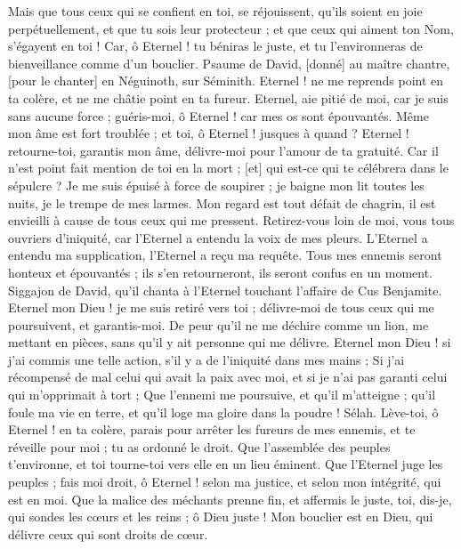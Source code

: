 \begin{multicols}{2}
Mais que tous ceux qui se confient en toi, se réjouissent, qu'ils soient en joie perpétuellement, et que tu sois leur protecteur ; et que ceux qui aiment ton Nom, s'égayent en toi !
Car, ô Eternel ! tu béniras le juste, et tu l'environneras de bienveillance comme d'un bouclier.
\VerseOne{}Psaume de David, [donné] au maître chantre, [pour le chanter] en Néguinoth, sur Séminith. Eternel ! ne me reprends point en ta colère, et ne me châtie point en ta fureur.
Eternel, aie pitié de moi, car je suis sans aucune force ; guéris-moi, ô Eternel ! car mes os sont épouvantés.
Même mon âme est fort troublée ; et toi, ô Eternel ! jusques à quand ?
Eternel ! retourne-toi, garantis mon âme, délivre-moi pour l'amour de ta gratuité.
Car il n'est point fait mention de toi en la mort ; [et] qui est-ce qui te célébrera dans le sépulcre ?
Je me suis épuisé à force de soupirer ; je baigne mon lit toutes les nuits, je le trempe de mes larmes.
Mon regard est tout défait de chagrin, il est envieilli à cause de tous ceux qui me pressent.
Retirez-vous loin de moi, vous tous ouvriers d'iniquité, car l'Eternel a entendu la voix de mes pleurs.
L'Eternel a entendu ma supplication, l'Eternel a reçu ma requête.
Tous mes ennemis seront honteux et épouvantés ; ils s'en retourneront, ils seront confus en un moment.
\VerseOne{}Siggajon de David, qu'il chanta à l'Eternel touchant l'affaire de Cus Benjamite. Eternel mon Dieu ! je me suis retiré vers toi ; délivre-moi de tous ceux qui me poursuivent, et garantis-moi.
De peur qu'il ne me déchire comme un lion, me mettant en pièces, sans qu'il y ait personne qui me délivre.
Eternel mon Dieu ! si j'ai commis une telle action, s'il y a de l'iniquité dans mes mains ;
Si j'ai récompensé de mal celui qui avait la paix avec moi, et si je n'ai pas garanti celui qui m'opprimait à tort ;
Que l'ennemi me poursuive, et qu'il m'atteigne ; qu'il foule ma vie en terre, et qu'il loge ma gloire dans la poudre ! Sélah.
Lève-toi, ô Eternel ! en ta colère, parais pour arrêter les fureurs de mes ennemis, et te réveille pour moi ; tu as ordonné le droit.
Que l'assemblée des peuples t'environne, et toi tourne-toi vers elle en un lieu éminent.
Que l'Eternel juge les peuples ; fais moi droit, ô Eternel ! selon ma justice, et selon mon intégrité, qui est en moi.
Que la malice des méchants prenne fin, et affermis le juste, toi, dis-je, qui sondes les cœurs et les reins ; ô Dieu juste !
Mon bouclier est en Dieu, qui délivre ceux qui sont droits de cœur.

\end{multicols}
